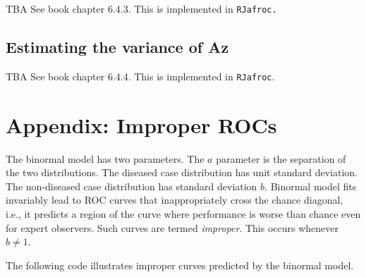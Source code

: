 \documentclass[
]{book}
\begin{document}
TBA See book chapter 6.4.3. This is implemented in \texttt{RJafroc.}

\hypertarget{estimating-the-variance-of-az}{%
\subsection{Estimating the variance of Az}\label{estimating-the-variance-of-az}}

TBA See book chapter 6.4.4. This is implemented in \texttt{RJafroc}.

\hypertarget{binormal-model-improper-curves}{%
\section{Appendix: Improper ROCs}\label{binormal-model-improper-curves}}

The binormal model has two parameters. The \(a\) parameter is the separation of the two distributions. The diseased case distribution has unit standard deviation. The non-diseased case distribution has standard deviation \(b\). Binormal model fits invariably lead to ROC curves that inappropriately cross the chance diagonal, i.e., it predicts a region of the curve where performance is worse than chance even for expert observers. Such curves are termed \emph{improper}. This occurs whenever \(b \ne 1\).

The following code illustrates improper curves predicted by the binormal model.
\end{document}
